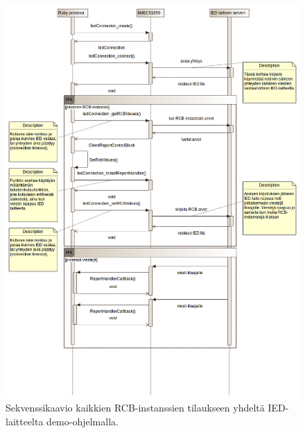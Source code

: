 \begin{figure}
	\includegraphics[width=1\textwidth]{pictures/sequence-diagram-report-subscription.png}
	\caption{Sekvenssikaavio kaikkien RCB-instanssien tilaukseen yhdeltä IED-laitteelta demo-ohjelmalla.}
	\label{fig:sequence-diagram-report-subscription}
\end{figure}

